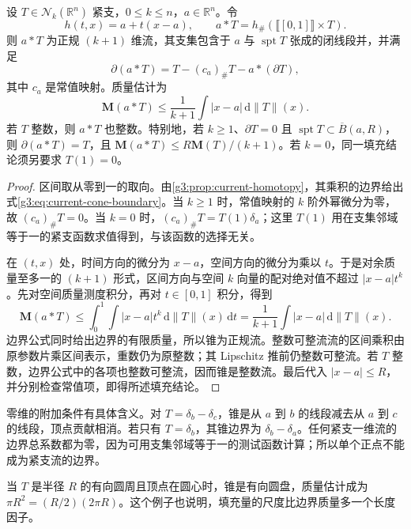 \begin{proposition}\label{g3:prop:current-cone-filling}
	设 \(T\in\mathcal N_k(\mathbb R^n)\) 紧支，\(0\le k\le n\)，\(a\in\mathbb R^n\)。令
	\[
		h(t,x)=a+t(x-a),\qquad
		a*T=h_\#(\lBrack[0,1]\rBrack\times T).
	\]
	则 \(a*T\) 为正规 \((k+1)\) 维流，其支集包含于 \(a\) 与 \(\operatorname{spt}T\) 张成的闭线段并，并满足
	\begin{equation}\label{g3:eq:current-cone-boundary}
		\partial(a*T)=T-(c_a)_\#T-a*(\partial T),
	\end{equation}
	其中 \(c_a\) 是常值映射。质量估计为
	\begin{equation}\label{g3:eq:current-cone-mass}
		\mathbf M(a*T)\le\frac1{k+1}\int|x-a|\,\mathrm d\|T\|(x).
	\end{equation}
	若 \(T\) 整数，则 \(a*T\) 也整数。特别地，若 \(k\ge1\)、\(\partial T=0\) 且 \(\operatorname{spt}T\subset\overline B(a,R)\)，则 \(\partial(a*T)=T\)，且 \(\mathbf M(a*T)\le R\mathbf M(T)/(k+1)\)。若 \(k=0\)，同一填充结论须另要求 \(T(1)=0\)。
\end{proposition}
\begin{proof}
	区间取从零到一的取向。由\cref{g3:prop:current-homotopy}，其乘积的边界给出式\eqref{g3:eq:current-cone-boundary}。当 \(k\ge1\) 时，常值映射的 \(k\) 阶外幂微分为零，故 \((c_a)_\#T=0\)。当 \(k=0\) 时，\((c_a)_\#T=T(1)\delta_a\)；这里 \(T(1)\) 用在支集邻域等于一的紧支函数求值得到，与该函数的选择无关。

	在 \((t,x)\) 处，时间方向的微分为 \(x-a\)，空间方向的微分为乘以 \(t\)。于是对余质量至多一的 \((k+1)\) 形式，区间方向与空间 \(k\) 向量的配对绝对值不超过 \(|x-a|t^k\)。先对空间质量测度积分，再对 \(t\in[0,1]\) 积分，得到
	\[
		\mathbf M(a*T)\le\int_0^1\int|x-a|t^k\,\mathrm d\|T\|(x)\,\mathrm dt
		=\frac1{k+1}\int|x-a|\,\mathrm d\|T\|(x).
	\]
	边界公式同时给出边界的有限质量，所以锥为正规流。整数可整流流的区间乘积由原参数片乘区间表示，重数仍为原整数；其 Lipschitz 推前仍整数可整流。若 \(T\) 整数，边界公式中的各项也整数可整流，因而锥是整数流。最后代入 \(|x-a|\le R\)，并分别检查常值项，即得所述填充结论。
\end{proof}

零维的附加条件有具体含义。对 \(T=\delta_b-\delta_c\)，锥是从 \(a\) 到 \(b\) 的线段减去从 \(a\) 到 \(c\) 的线段，顶点贡献相消。若只有 \(T=\delta_b\)，其锥边界为 \(\delta_b-\delta_a\)。任何紧支一维流的边界总系数都为零，因为可用支集邻域等于一的测试函数计算；所以单个正点不能成为紧支流的边界。

当 \(T\) 是半径 \(R\) 的有向圆周且顶点在圆心时，锥是有向圆盘，质量估计成为 \(\pi R^2=(R/2)(2\pi R)\)。这个例子也说明，填充量的尺度比边界质量多一个长度因子。


